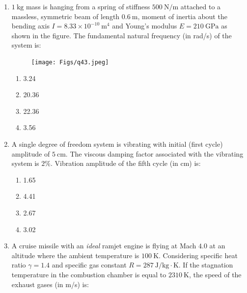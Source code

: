 \documentclass[journal]{IEEEtran}
\begin{document}
\begin{enumerate}
\item \quad $1\ \mathrm{kg}$ mass is hanging from a spring of stiffness $500\ \mathrm{N/m}$ attached to a massless, symmetric beam of length $0.6\ \mathrm{m}$, moment of inertia about the bending axis $I = 8.33 \times 10^{-10}\ \mathrm{m}^4$ and Young's modulus $E = 210\ \mathrm{GPa}$ as shown in the figure. The fundamental natural frequency (in rad/s) of the system is:

\begin{figure}[H]
\centering
\texttt{[image: Figs/q43.jpeg]}
\caption{}
\end{figure}

\begin{multicols}{2}
\begin{enumerate}
    \item 3.24
    \item 20.36
    \item 22.36
    \item 3.56
\end{enumerate}
\end{multicols}

\hfill{}

\item \quad A single degree of freedom system is vibrating with initial (first cycle) amplitude of $5\ \mathrm{cm}$. The viscous damping factor associated with the vibrating system is $2\%$. Vibration amplitude of the fifth cycle (in cm) is:

\begin{multicols}{2}
\begin{enumerate}
    \item 1.65
    \item 4.41
    \item 2.67
    \item 3.02
\end{enumerate}
\end{multicols}
\hfill{}

\item \quad A cruise missile with an \textit{ideal} ramjet engine is flying at Mach $4.0$ at an altitude where the ambient temperature is $100\ \mathrm{K}$. Considering specific heat ratio $\gamma = 1.4$ and specific gas constant $R = 287\ \mathrm{J/kg\cdot K}$. If the stagnation temperature in the combustion chamber is equal to $2310\ \mathrm{K}$, the speed of the exhaust gases (in m/s) is:

\hfill{}


\end{enumerate}
\end{document}
